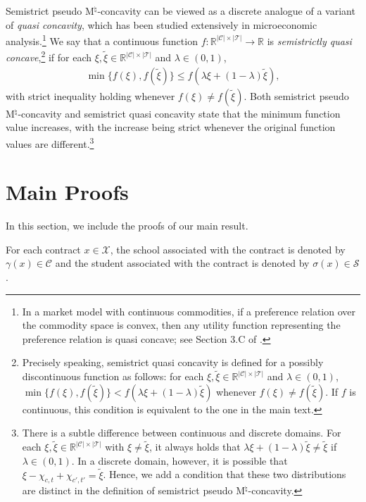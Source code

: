 \documentclass[12pt]{amsart}
\theoremstyle{remark}
\begin{document}
Semistrict pseudo M$^\natural$-concavity can be viewed as a discrete analogue of a variant of {\it quasi concavity},
which has been studied extensively in microeconomic analysis.\footnote{In a market model with continuous commodities, if a preference relation over the commodity space is convex, then any utility function representing the preference relation is quasi concave; see Section 3.C of \cite{masco95}.}
We say that a continuous function $f: \mathbb{R}^{|\mathcal{C}|\times |\mathcal{T}|}\rightarrow \mathbb{R}$ is {\it semistrictly quasi concave},\footnote{Precisely speaking, semistrict quasi concavity is defined for a possibly discontinuous function as follows: for each $\xi, \tilde \xi\in \mathbb{R}^{|\mathcal{C}|\times |\mathcal{T}|}$ and $\lambda \in (0,1)$,
$\min\{f(\xi), f(\tilde \xi)\}<f(\lambda \xi+(1-\lambda) \tilde \xi)$ whenever $f(\xi)\neq f(\tilde \xi)$. If $f$ is continuous, this condition is equivalent to the one in the main text.} if for each $\xi, \tilde \xi\in \mathbb{R}^{|\mathcal{C}|\times |\mathcal{T}|}$ and $\lambda \in (0,1)$,
\begin{align*}
\min\{f(\xi), f(\tilde \xi)\}\leq f(\lambda \xi+(1-\lambda) \tilde \xi),
\end{align*}
with strict inequality holding whenever $f(\xi)\neq f(\tilde \xi)$.
Both semistrict pseudo M$^\natural$-concavity and semistrict quasi concavity state that the minimum function value increases, with the increase being strict whenever the original function values are different.\footnote{There is a subtle difference between continuous and discrete domains. For each $\xi, \tilde \xi\in \mathbb{R}^{|\mathcal{C}|\times |\mathcal{T}|}$ with $\xi\neq \tilde \xi$, it always holds that $\lambda \xi+(1-\lambda) \tilde \xi\neq \tilde \xi$ if $\lambda \in (0,1)$. In a discrete domain, however, it is possible that $\xi-\chi_{c,t}+\chi_{c',t'}=\tilde \xi$. Hence, we add a condition that these two distributions are distinct in the definition of semistrict pseudo M$^\natural$-concavity.}


\section{Main Proofs}\label{app:proofs}
In this section, we include the proofs of our main result.

For each contract $x\in \mathcal{X}$, the
school associated with the contract is denoted by $\gamma(x) \in \mathcal{C}$ and the
student associated with the contract is denoted by $\sigma(x) \in \mathcal{S}$.
\end{document}
